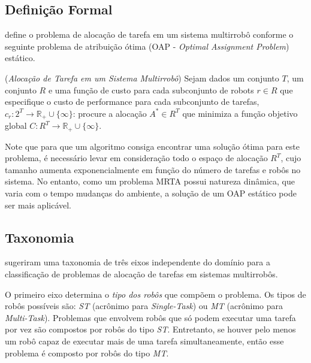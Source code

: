         
        \subsection{Definição Formal} \label{subsec:mrta_formal}
             define o problema de alocação de tarefa em um sistema multirrobô conforme o seguinte problema de atribuição ótima (OAP - \textit{Optimal Assignment Problem}) estático.
            
            \begin{definicao} \label{def:mrta}
                (\textit{Alocação de Tarefa em um Sistema Multirrobô})
                Sejam dados um conjunto $T$, um conjunto $R$ e uma função de custo para cada subconjunto de robots $r \in R$ que especifique o custo de performance para cada subconjunto de tarefas, $c_r : 2^T \to \mathbb{R}_+\cup\{\infty\}$: procure a alocação $A^* \in R^T$ que minimiza a função objetivo global $C : R^T \to \mathbb{R}_+\cup\{\infty\}$.
            \end{definicao}
        
            Note que para que um algoritmo consiga encontrar uma solução ótima para este problema, é necessário levar em consideração todo o espaço de alocação $R^T$, cujo tamanho aumenta exponencialmente em função do número de tarefas e robôs no sistema. No entanto, como um problema MRTA possui natureza dinâmica, que varia com o tempo mudanças do ambiente, a solução de um OAP estático pode ser mais aplicável.
    
        \subsection{Taxonomia} \label{subsec:taxonomia_mrta}
             sugeriram uma taxonomia de três eixos independente do domínio para a classificação de problemas de alocação de tarefas em sistemas multirrobôs. 
            
            O primeiro eixo determina o \textit{tipo dos robôs} que compõem o problema. Os tipos de robôs possíveis são: \textit{ST} (acrônimo para \textit{Single-Task}) ou \textit{MT} (acrônimo para \textit{Multi-Task}). Problemas que envolvem robôs que só podem executar uma tarefa por vez são compostos por robôs do tipo \textit{ST}. Entretanto, se houver pelo menos um robô capaz de executar mais de uma tarefa simultaneamente, então esse problema é composto por robôs do tipo \textit{MT}. 
            

